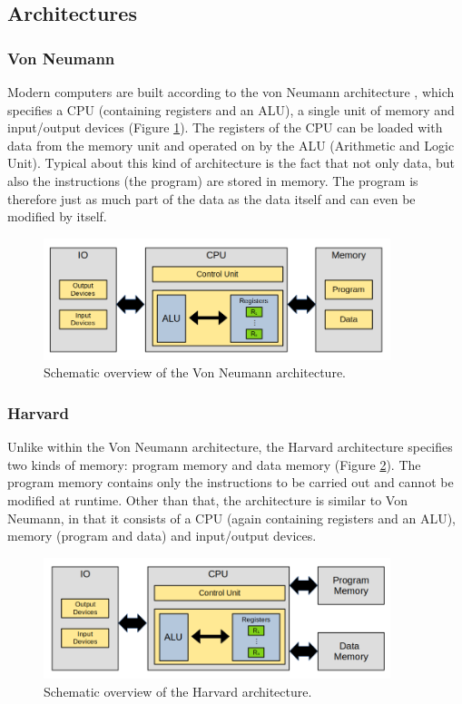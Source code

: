 \subsection{Architectures}
\subsubsection{Von Neumann}
Modern computers are built according to the von Neumann architecture \cite{vonneumann-wiki}, which specifies a CPU (containing registers and an ALU), a single unit of memory and input/output devices (Figure \ref{fig:vonneumann}). The registers of the CPU can be loaded with data from the memory unit and operated on by the ALU (Arithmetic and Logic Unit). Typical about this kind of architecture is the fact that not only data, but also the instructions (the program) are stored in memory. The program is therefore just as much part of the data as the data itself and can even be modified by itself.
\begin{figure}[H]
  \centering
  \includegraphics[width=0.9\textwidth]{img/vonneumann}
  \caption{Schematic overview of the Von Neumann architecture.}
  \label{fig:vonneumann}
\end{figure}

\subsubsection{Harvard}
Unlike within the Von Neumann architecture, the Harvard architecture specifies two kinds of memory: program memory and data memory (Figure \ref{fig:harvard}). The program memory contains only the instructions to be carried out and cannot be modified at runtime. Other than that, the architecture is similar to Von Neumann, in that it consists of a CPU (again containing registers and an ALU), memory (program and data) and input/output devices.
\begin{figure}[H]
  \centering
  \includegraphics[width=0.9\textwidth]{img/harvard}
  \caption{Schematic overview of the Harvard architecture.}
  \label{fig:harvard}
\end{figure}


